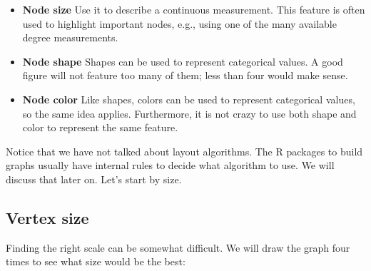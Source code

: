\documentclass[]{book}
\newenvironment{Shaded}{\begin{snugshade}}{\end{snugshade}}
\newcommand{\CommentTok}[1]{\textcolor[rgb]{0.56,0.35,0.01}{\textit{#1}}}
\newcommand{\DataTypeTok}[1]{\textcolor[rgb]{0.13,0.29,0.53}{#1}}
\newcommand{\DecValTok}[1]{\textcolor[rgb]{0.00,0.00,0.81}{#1}}
\newcommand{\FloatTok}[1]{\textcolor[rgb]{0.00,0.00,0.81}{#1}}
\newcommand{\KeywordTok}[1]{\textcolor[rgb]{0.13,0.29,0.53}{\textbf{#1}}}
\newcommand{\NormalTok}[1]{#1}
\newcommand{\OperatorTok}[1]{\textcolor[rgb]{0.81,0.36,0.00}{\textbf{#1}}}
\newcommand{\StringTok}[1]{\textcolor[rgb]{0.31,0.60,0.02}{#1}}
\begin{document}
\begin{itemize}
\item
  \textbf{Node size} Use it to describe a continuous measurement. This feature is often
  used to highlight important nodes, e.g., using one of the many available degree measurements.
\item
  \textbf{Node shape} Shapes can be used to represent categorical values. A good figure
  will not feature too many of them; less than four would make sense.
\item
  \textbf{Node color} Like shapes, colors can be used to represent categorical values, so the
  same idea applies. Furthermore, it is not crazy to use both shape and color to
  represent the same feature.
\end{itemize}

Notice that we have not talked about layout algorithms. The R packages to build
graphs usually have internal rules to decide what algorithm to use. We will discuss that
later on. Let's start by size.

\hypertarget{vertex-size}{%
\subsection{Vertex size}\label{vertex-size}}

Finding the right scale can be somewhat difficult. We
will draw the graph four times to see what size would be the best:

\begin{Shaded}
\end{Shaded}
\end{document}
